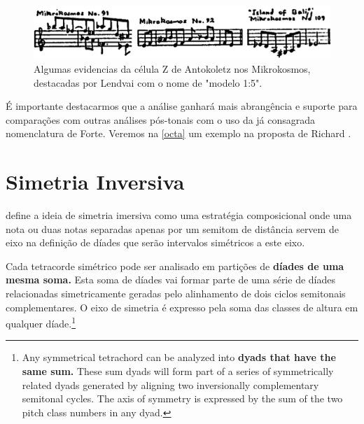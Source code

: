 \documentclass[
	12pt,				%
	openright,			%
	twoside,			%
	a4paper,			%
	english,			%
	french,				%
	spanish,			%
	brazil				%
	]{abntex2}
\begin{document}
\begin{figure}[!h]
	\caption{\label{fig_grafico}Algumas evidencias da célula Z de Antokoletz nos Mikrokosmos, destacadas por Lendvai com o nome de "modelo 1:5". }
	\begin{center}
	    \includegraphics[scale=0.4]{intervalar/Lendvai_p52_ZCell.png}
	\end{center}
\end{figure}

É importante destacarmos que a análise ganhará mais abrangência e suporte para comparações com outras análises pós-tonais com o uso da já consagrada nomenclatura de Forte. Veremos na \autoref{octa} um exemplo na proposta de Richard . 
 
\section{Simetria Inversiva}
\label{simetria}

 define a ideia de simetria imersiva como uma estratégia composicional onde uma nota ou duas notas separadas apenas por um semitom de distância servem de eixo na definição de díades que serão intervalos simétricos a este eixo.

\begin{citacao}

Cada tetracorde simétrico pode ser analisado em partições de \textbf{díades de uma mesma soma.} Esta soma de díades vai formar parte de uma série de díades relacionadas simetricamente geradas pelo alinhamento de dois ciclos semitonais complementares. O eixo de simetria é expresso pela soma das classes de altura em qualquer díade.\cite[p. 72]{antokoletz1984music}\footnote{Any symmetrical tetrachord can be analyzed into\textbf{ dyads that have the same sum.} These sum dyads will form part of a series of symmetrically related dyads generated by aligning two inversionally complementary semitonal cycles. The axis of symmetry is expressed by the sum of the two pitch class numbers in any dyad.\cite[p. 72, grifo nosso]{antokoletz1984music}}
\end{citacao}
\end{document}
